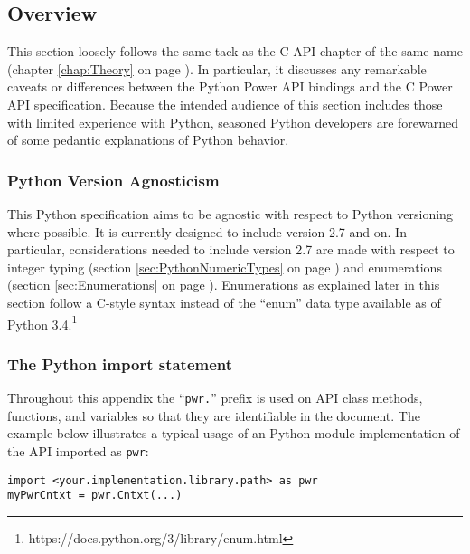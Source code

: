 \documentclass[12pt]{report} %
\begin{document}
\begin{appendices}
\subsection{Overview}\label{sec:PythonOverview}

This section loosely follows the same tack as the C API chapter
of the same name (chapter \ref{chap:Theory} on page \pageref{chap:Theory}). In
particular, it discusses any remarkable caveats or differences between the
Python Power API bindings and the C Power API specification. Because the
intended audience of this section includes those with limited experience with
Python, seasoned Python developers are forewarned of some pedantic explanations
of Python behavior.

\subsubsection{Python Version Agnosticism}\label{sec:PythonVersionAgnosticism}

This Python specification aims to be agnostic with respect to Python versioning
where possible. It is currently designed to include version 2.7 and on. In
particular, considerations needed to include version 2.7 are made with respect
to integer typing (section \ref{sec:PythonNumericTypes} on page
\pageref{sec:PythonNumericTypes}) and enumerations (section
\ref{sec:Enumerations} on page \pageref{sec:Enumerations}). Enumerations as
explained later in this section follow a C-style syntax instead of the ``enum''
data type available as of Python
3.4.\footnote{https://docs.python.org/3/library/enum.html}

\subsubsection{The Python import statement}\label{sec:PythonImport}

Throughout this appendix the ``\texttt{pwr.}'' prefix is used on API class methods,
functions, and variables so that they are identifiable in the document. The
example below illustrates a typical usage of an Python module implementation of
the API imported as \texttt{pwr}:

\begin{center}\begin{minipage}{.95\linewidth}\begin{lstlisting}
import <your.implementation.library.path> as pwr
myPwrCntxt = pwr.Cntxt(...)
\end{lstlisting}\end{minipage}\end{center}


\end{appendices}
\end{document}
